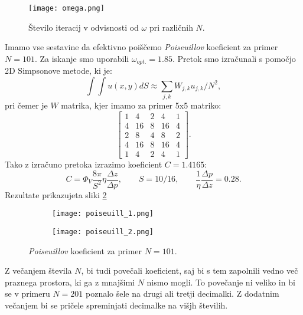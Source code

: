 \documentclass[12pt,a4paper]{article}
\begin{document}
\begin{figure}[H]
\begin{center}
\texttt{[image: omega.png]}
\caption{Število iteracij v odvisnosti od $\omega$ pri različnih $N$.} \label{fig:slika10}
\end{center}
\end{figure}

Imamo vse sestavine da efektivno poiščemo \textit{Poiseuillov} koeficient za primer $N=101$. Za iskanje smo uporabili $\omega_{opt.}=1.85$. Pretok smo izračunali s pomočjo 2D Simpsonove metode, ki je:
\begin{equation}
\int \int u(x,y) dS \approx \sum _{j,k} W_{j,k} u_{j,k} /N^{2},
\end{equation}
pri čemer je $W$ matrika, kjer imamo za primer 5x5 matriko:
\begin{equation*}
\begin{bmatrix}
1 & 4 & 2 & 4 & 1 \\
4 & 16 & 8 & 16 & 4 \\
2 & 8 & 4 & 8 & 2 \\
4 & 16 & 8 & 16 & 4 \\
1 & 4 & 2 & 4 & 1 
\end{bmatrix}.
\end{equation*} 
Tako z izračuno pretoka izrazimo koeficient $C=1.4165$:
\begin{equation*}
C=\Phi _{V}\frac{8 \pi}{S^{2}}\eta \frac{\Delta z}{\Delta p}, \qquad S= 10/16, \qquad \frac{1}{\eta} \frac{\Delta p}{\Delta z}=0.28.
\end{equation*}
Rezultate prikazujeta sliki \ref{fig:slika11}

\begin{figure}[H]
    \centering
    \begin{subfigure}[b]{0.49\textwidth}
        \texttt{[image: poiseuill\_1.png]}
    \end{subfigure}
    \begin{subfigure}[b]{0.49\textwidth}
        \texttt{[image: poiseuill\_2.png]}
    \end{subfigure}
    \caption{\textit{Poiseuillov} koeficient za primer $N=101$.} \label{fig:slika11}
\end{figure}

\noindent Z večanjem števila $N$, bi tudi povečali koeficient, saj bi s tem zapolnili vedno več praznega prostora, ki ga z mnajšimi $N$ nismo mogli. To povečanje ni veliko in bi se v primeru $N=201$ poznalo šele na drugi ali tretji decimalki. Z dodatnim večanjem bi se pričele spreminjati decimalke na višjh številih.
\end{document}
